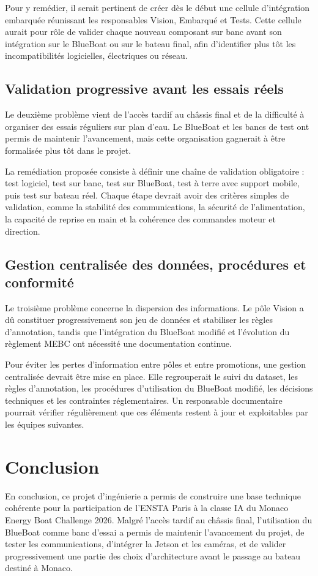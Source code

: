 \documentclass[11pt,letterpaper]{article}
\begin{document}
Pour y remédier, il serait pertinent de créer dès le début une cellule d'intégration embarquée réunissant les responsables Vision, Embarqué et Tests. Cette cellule aurait pour rôle de valider chaque nouveau composant sur banc avant son intégration sur le BlueBoat ou sur le bateau final, afin d'identifier plus tôt les incompatibilités logicielles, électriques ou réseau.

\subsection*{Validation progressive avant les essais réels}
Le deuxième problème vient de l'accès tardif au châssis final et de la difficulté à organiser des essais réguliers sur plan d'eau. Le BlueBoat et les bancs de test ont permis de maintenir l'avancement, mais cette organisation gagnerait à être formalisée plus tôt dans le projet.

La remédiation proposée consiste à définir une chaîne de validation obligatoire : test logiciel, test sur banc, test sur BlueBoat, test à terre avec support mobile, puis test sur bateau réel. Chaque étape devrait avoir des critères simples de validation, comme la stabilité des communications, la sécurité de l'alimentation, la capacité de reprise en main et la cohérence des commandes moteur et direction.

\subsection*{Gestion centralisée des données, procédures et conformité}
Le troisième problème concerne la dispersion des informations. Le pôle Vision a dû constituer progressivement son jeu de données et stabiliser les règles d'annotation, tandis que l'intégration du BlueBoat modifié et l'évolution du règlement MEBC ont nécessité une documentation continue.

Pour éviter les pertes d'information entre pôles et entre promotions, une gestion centralisée devrait être mise en place. Elle regrouperait le suivi du dataset, les règles d'annotation, les procédures d'utilisation du BlueBoat modifié, les décisions techniques et les contraintes réglementaires. Un responsable documentaire pourrait vérifier régulièrement que ces éléments restent à jour et exploitables par les équipes suivantes.

\section{Conclusion}
En conclusion, ce projet d'ingénierie a permis de construire une base technique cohérente pour la participation de l'ENSTA Paris à la classe IA du Monaco Energy Boat Challenge 2026. Malgré l'accès tardif au châssis final, l'utilisation du BlueBoat comme banc d'essai a permis de maintenir l'avancement du projet, de tester les communications, d'intégrer la Jetson et les caméras, et de valider progressivement une partie des choix d'architecture avant le passage au bateau destiné à Monaco.
\end{document}
